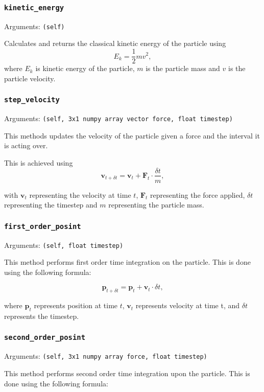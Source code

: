 \documentclass[a4paper, 11pt, british, left=1in, right=1in, top=0.3in, bottom=1in]{article}
\begin{document}
	\subsubsection{\texttt{kinetic\_energy}}
	
	Arguments: \texttt{(self)}
	
	Calculates and returns the classical kinetic energy of the particle using $$E_k = \dfrac{1}{2}mv^2,$$ where $E_k$ is kinetic energy of the particle, $m$ is the particle mass and $v$ is the particle velocity.
	
	\subsubsection{\texttt{step\_velocity}}
	
	Arguments: \texttt{(self, 3x1 numpy array vector force, float timestep)}
	
	This methods updates the velocity of the particle given a force and the interval it is acting over. 
	
	This is achieved using $$\textbf{v}_{t+\delta t} = \textbf{v}_t + \textbf{F}_t\cdot\frac{\delta t}{m},$$
	
	with $\textbf{v}_t$ representing the velocity at time $t$, $\textbf{F}_t$ representing the force applied, $\delta t$ representing the timestep and $m$ representing the particle mass. 
	\subsubsection{\texttt{first\_order\_posint}}
	
	Arguments: \texttt{(self, float timestep)}
	
	This method performs first order time integration on the particle. This is done using the following formula:
	
	$$\textbf{p}_{t+\delta t} = \textbf{p}_t + \textbf{v}_t \cdot \delta t, $$
	
	where $\textbf{p}_t$ represents position at time $t$, $\textbf{v}_t$ represents velocity at time t, and $\delta t$ represents the timestep. 
	
	\subsubsection{\texttt{second\_order\_posint}}
	
	Arguments: \texttt{(self, 3x1 numpy array force, float timestep)}
	
	This method performs second order time integration upon the particle. This is done using the following formula: 
	
\end{document}
